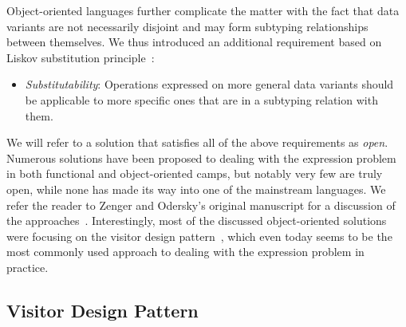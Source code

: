 \documentclass[preprint]{sigplanconf}
\begin{document}

\noindent
Object-oriented languages further complicate the matter with the fact that 
data variants are not necessarily disjoint and may form subtyping relationships  
between themselves. We thus introduced an additional requirement based on 
Liskov substitution principle~\cite{Lis87}:

\begin{itemize}
\setlength{\itemsep}{0pt}
\setlength{\parskip}{0pt}
\item \emph{Substitutability}: Operations expressed on more general data variants
      should be applicable to more specific ones that are in a subtyping relation 
      with them.
\end{itemize}


\noindent
We will refer to a solution that satisfies all of the above requirements as \emph{open}. 
Numerous solutions have been proposed to dealing with the expression problem in both 
functional and object-oriented camps, but notably very few are truly open, while 
none has made its way into one of the mainstream languages. We refer the reader 
to Zenger and Odersky's original manuscript for a discussion of the 
approaches~\cite{fool12}. Interestingly, most of the discussed object-oriented 
solutions were focusing on the visitor design pattern~\cite{DesignPatterns1993}, 
which even today seems to be the most commonly used approach to dealing with the 
expression problem in practice.

\subsection{Visitor Design Pattern}
\label{sec:vdp}

\end{document}
